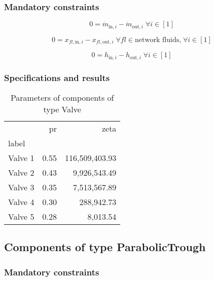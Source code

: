 \documentclass[]{article}
\begin{document}
\subsubsection{Mandatory constraints}

\begin{equation}
\label{eq:Valve_mass_flow_constraints}
0=\dot{m}_{\mathrm{in,}i}-\dot{m}_{\mathrm{out,}i}\; \forall i \in [1]
\end{equation}

\begin{equation}
\label{eq:Valve_fluid_constraints}
0=x_{fl\mathrm{,in,}i}-x_{fl\mathrm{,out,}i}\;\forall fl \in\text{network fluids,}\; \forall i \in [1]
\end{equation}

\begin{equation}
\label{eq:Valve_enthalpy_equality_constraints}
0=h_{\mathrm{in,}i}-h_{\mathrm{out,}i}\; \forall i \in [1]
\end{equation}


\subsubsection{Specifications and results}

\begin{table}[H]
\centering
\caption{Parameters of components of type Valve}
\begin{tabular}{lrr}
\toprule
{} &    pr &            zeta \\
label   &       &                 \\
\midrule
Valve 1 &  0.55 &  116,509,403.93 \\
Valve 2 &  0.43 &    9,926,543.49 \\
Valve 3 &  0.35 &    7,513,567.89 \\
Valve 4 &  0.30 &      288,942.73 \\
Valve 5 &  0.28 &        8,013.54 \\
\bottomrule
\end{tabular}
\end{table}
\subsection{Components of type ParabolicTrough}

\subsubsection{Mandatory constraints}
\end{document}
